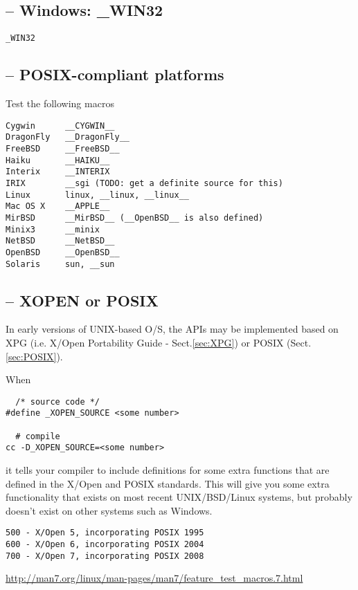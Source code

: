 \subsection{-- Windows: \_WIN32}

\verb!_WIN32!

\subsection{-- POSIX-compliant platforms}

Test the following macros
\begin{verbatim}
Cygwin      __CYGWIN__
DragonFly   __DragonFly__
FreeBSD     __FreeBSD__
Haiku       __HAIKU__
Interix     __INTERIX
IRIX        __sgi (TODO: get a definite source for this)
Linux       linux, __linux, __linux__
Mac OS X    __APPLE__
MirBSD      __MirBSD__ (__OpenBSD__ is also defined)
Minix3      __minix
NetBSD      __NetBSD__
OpenBSD     __OpenBSD__
Solaris     sun, __sun
\end{verbatim}


\subsection{-- XOPEN or POSIX}
\label{sec:_XOPEN_SOURCE}
\label{sec:_POSIX_C_SOURCE}

In early versions of UNIX-based O/S, the APIs may be implemented based on XPG
(i.e. X/Open Portability Guide - Sect.\ref{sec:XPG}) or POSIX
(Sect.\ref{sec:POSIX}).

When 
\begin{verbatim}
  /* source code */
#define _XOPEN_SOURCE <some number>

  # compile
cc -D_XOPEN_SOURCE=<some number>
\end{verbatim}
it tells your compiler to include definitions for some extra functions that are
defined in the X/Open and POSIX standards. This will give you some extra
functionality that exists on most recent UNIX/BSD/Linux systems, but probably
doesn't exist on other systems such as Windows.

\begin{verbatim}
500 - X/Open 5, incorporating POSIX 1995
600 - X/Open 6, incorporating POSIX 2004
700 - X/Open 7, incorporating POSIX 2008
\end{verbatim}
\url{http://man7.org/linux/man-pages/man7/feature_test_macros.7.html}


